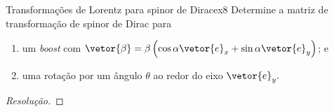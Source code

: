 \begin{exercício}{Transformações de Lorentz para spinor de Dirac}{ex8}
    Determine a matriz de transformação de spinor de Dirac para
    \begin{enumerate}[label=(\alph*)]
        \item um \emph{boost} com \(\vetor{\beta} = \beta\left(\cos\alpha \vetor{e}_x + \sin\alpha \vetor{e}_y\right)\); e
        \item uma rotação por um ângulo \(\theta\) ao redor do eixo \(\vetor{e}_y.\)
    \end{enumerate}
\end{exercício}
\begin{proof}[Resolução]
    
\end{proof}
